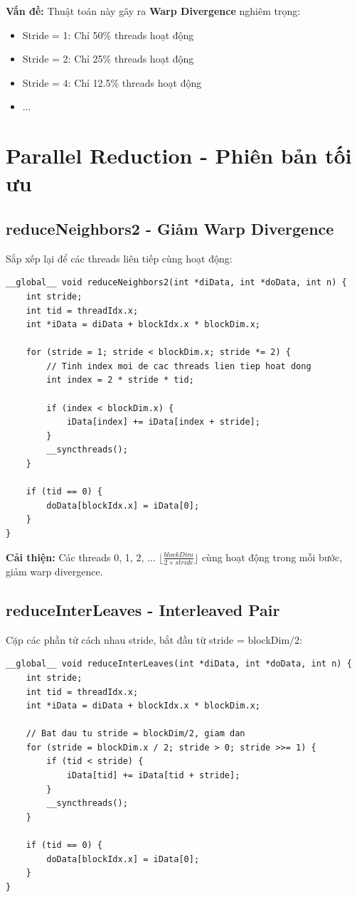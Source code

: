 \textbf{Vấn đề:} Thuật toán này gây ra \textbf{Warp Divergence} nghiêm trọng:
\begin{itemize}
    \item Stride = 1: Chỉ 50\% threads hoạt động
    \item Stride = 2: Chỉ 25\% threads hoạt động
    \item Stride = 4: Chỉ 12.5\% threads hoạt động
    \item ...
\end{itemize}

\section{Parallel Reduction - Phiên bản tối ưu}

\subsection{reduceNeighbors2 - Giảm Warp Divergence}

Sắp xếp lại để các threads liên tiếp cùng hoạt động:

\begin{lstlisting}[caption={Parallel Reduction - reduceNeighbors2}, label={lst:reduce_neighbors2}]
__global__ void reduceNeighbors2(int *diData, int *doData, int n) {
    int stride;
    int tid = threadIdx.x;
    int *iData = diData + blockIdx.x * blockDim.x;
    
    for (stride = 1; stride < blockDim.x; stride *= 2) {
        // Tinh index moi de cac threads lien tiep hoat dong
        int index = 2 * stride * tid;
        
        if (index < blockDim.x) {
            iData[index] += iData[index + stride];
        }
        __syncthreads();
    }
    
    if (tid == 0) {
        doData[blockIdx.x] = iData[0];
    }
}
\end{lstlisting}

\textbf{Cải thiện:} Các threads 0, 1, 2, ... $\lfloor\frac{blockDim}{2 \times stride}\rfloor$ cùng hoạt động trong mỗi bước, giảm warp divergence.

\subsection{reduceInterLeaves - Interleaved Pair}

Cặp các phần tử cách nhau stride, bắt đầu từ stride = blockDim/2:

\begin{lstlisting}[caption={Parallel Reduction - Interleaved Pair}, label={lst:reduce_interleaved}]
__global__ void reduceInterLeaves(int *diData, int *doData, int n) {
    int stride;
    int tid = threadIdx.x;
    int *iData = diData + blockIdx.x * blockDim.x;
    
    // Bat dau tu stride = blockDim/2, giam dan
    for (stride = blockDim.x / 2; stride > 0; stride >>= 1) {
        if (tid < stride) {
            iData[tid] += iData[tid + stride];
        }
        __syncthreads();
    }
    
    if (tid == 0) {
        doData[blockIdx.x] = iData[0];
    }
}
\end{lstlisting}

